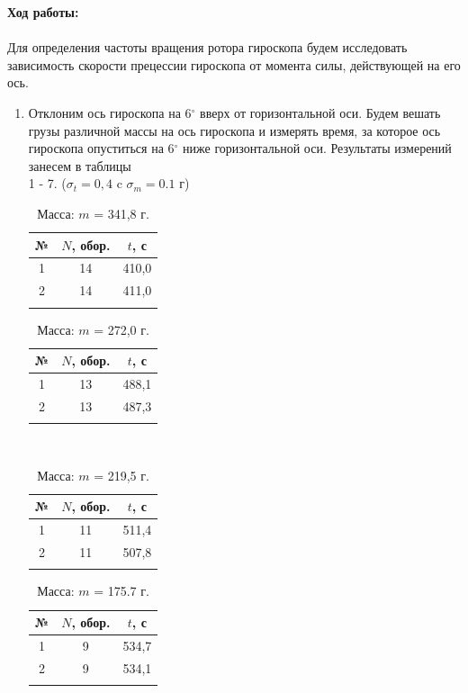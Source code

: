 \documentclass[a4paper, 12pt]{article}%
\begin{document}
	
	\textbf{Ход работы:} \\
	\\
		Для определения частоты вращения ротора гироскопа будем исследовать зависимость скорости прецессии гироскопа от момента силы, действующей на его ось.
			\begin{enumerate}
		\item Отклоним ось гироскопа на 6$^{\circ}$ вверх от горизонтальной оси. Будем вешать грузы различной массы на ось гироскопа и измерять время, за которое ось гироскопа опуститься на 6$^{\circ}$ ниже горизонтальной оси. Результаты измерений занесем в таблицы \\1 - 7. ($\sigma_t=0,4$ c $\sigma_m=0.1$ г)\\
		\begin{minipage}{0.4\textwidth}
			\begin{longtable}{|c|c|c|}
				
				\hline 
				№ & $N$, обор. & $t$, с \\
				\hline
				1 & 14 & 410,0\\
				\hline
				2 & 14 & 411,0 \\
				\hline
				\caption{Масса: $m$ = 341,8 г.}
			\end{longtable}
		\end{minipage}
		\begin{minipage}{0.4\textwidth}
			\begin{longtable}{|c|c|c|}
				\hline 
				№ & $N$, обор. & $t$, с \\
				\hline
				1 & 13 & 488,1\\
				\hline
				2 & 13 & 487,3 \\
				\hline
				\caption{Масса: $m$ = 272,0 г.}
			\end{longtable}
		\end{minipage}
		\\
		\begin{minipage}{0.4\textwidth}
			\begin{longtable}{|c|c|c|}
				
				\hline 
				№ & $N$, обор. & $ t$, с \\
				\hline
				1 & 11 & 511,4\\
				\hline
				2 & 11 & 507,8 \\
				\hline
				\caption{Масса: $m$ = 219,5 г.}
				
			\end{longtable}
		\end{minipage}
		\begin{minipage}{0.4\textwidth}
			\begin{longtable}{|c|c|c|}
				\hline 
				№ & $N$, обор. & $t$, с \\
				\hline
				1 & 9 & 534,7\\
				\hline
				2 &9 & 534,1\\
				\hline
				\caption{Масса: $m$ = 175.7 г.}
			\end{longtable}
		\end{minipage}
	

\end{enumerate}
\end{document}
